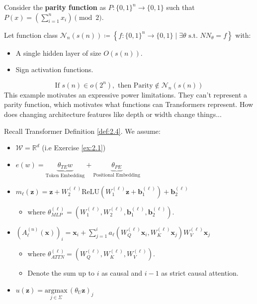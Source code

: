 \documentclass[12pt, twoside]{article}
\begin{document}
\begin{example}  \label{ex:4.1}
    Consider the \textbf{parity function}  as $P: \{0,1\}^n \to \{0,1\}$ such that $P(x) = \left( \sum_{i=1}^n x_i \right) \pmod 2$.

    Let function class $\mathcal{N}_n(s(n)) \coloneqq \left\{ f: \{0,1\}^n \to \{0,1\} \mid \exists \theta \text{ s.t. } NN_\theta = f \right\}$ with:
    \begin{itemize}
        \item A single hidden layer of size $O(s(n))$.
        \item Sign activation functions.
    \end{itemize}
    $$
    \text{If } s(n) \in o(2^n), \text{ then Parity} \notin \mathcal{N}_n(s(n))
    $$
    This example motivates an expressive power limitations. They can't represent a parity function, which motivates what functions can Transformers represent. How does changing architecture features like depth or width change things...
\end{example}

\begin{remark} \label{rm:4.1}
    Recall Transformer Definition \ref{def:2.4}. We assume:
    \begin{itemize}
        \item $\mathcal{W}=\mathbb{R}^d $ (i.e Exercise \ref{ex:2.1})
        \item $e(w) = \underbrace{\theta_{TE}w}_{\text{Token Embedding}} + \underbrace{\theta_{PE}}_{\text{Positional Embedding}}$
        \item $m_\ell(\mathbf{z}) = \mathbf{z} + W_2^{(\ell)} \text{ReLU}(W_1^{(\ell)} \mathbf{z} + \mathbf{b}_1^{(\ell)}) + \mathbf{b}_2^{(\ell)}
        $
        \begin{itemize}
            \item where $\theta_{MLP}^{(\ell)} = (W_1^{(\ell)}, W_2^{(\ell)}, \mathbf{b}_1^{(\ell)}, \mathbf{b}_2^{(\ell)})$.
        \end{itemize}

        \item $(A_\ell^{(n)}(\mathbf{x}))_i = \mathbf{x}_i + \sum_{j=1}^{i} a_\ell(W_Q^{(\ell)} \mathbf{x}_i, W_K^{(\ell)} \mathbf{x}_j) W_V^{(\ell)} \mathbf{x}_j
        $
        \begin{itemize}
            \item where $\theta_{ATTN}^{(\ell)} = (W_Q^{(\ell)}, W_K^{(\ell)}, W_V^{(\ell)})$.
            \item Denote the sum up to $i$ as causal and $i-1$ as strict causal attention.
        \end{itemize}

        \item $u(\mathbf{z}) = \underset{j \in \Sigma}{\text{argmax}} \, (\theta_U \mathbf{z})_j$
    \end{itemize}
\end{remark}
\end{document}
